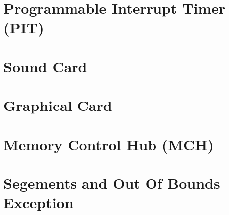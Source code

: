 \documentclass[oneside, a4paper]{memoir}
\begin{document}
\section{Programmable Interrupt Timer (PIT)}
\section{Sound Card}
\section{Graphical Card}
\section{Memory Control Hub (MCH)}
\section{Segements and Out Of Bounds Exception}
\end{document}
